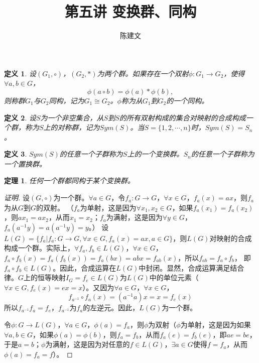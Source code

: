 \documentclass{article}
\newtheorem{Def}{定义}
\newtheorem{Thm}{定理}
\begin{document}
\begin{CJK*}{UTF8}{gbsn}
  \title{第五讲 变换群、同构}
  \author{陈建文}
  \maketitle
  
  \begin{Def}
    设$(G_1,\circ)$，$(G_2,*)$为两个群。如果存在一个双射$\phi:G_1\to G_2$，使得$\forall a,b\in G$，
    \[\phi(a\circ b)=\phi(a)* \phi(b),\]
    则称群$G_1$与$G_2$同构，记为$G_1\cong G_2$。$\phi$称为从$G_1$到$G_2$的一个同构。
  \end{Def}

  \begin{Def}
    设$S$为一个非空集合，从$S$到$S$的所有双射构成的集合对映射的合成构成一个群，称为$S$上的对称群，记为$Sym(S)$。当$S=\{1,2,\cdots,n\}$时，$Sym(S)=S_n$。
  \end{Def}

\begin{Def}
  $Sym(S)$的任意一个子群称为$S$上的一个变换群。$S_n$的任意一个子群称为一个置换群。
\end{Def}

\begin{Thm}
  任何一个群都同构于某个变换群。
\end{Thm}
\begin{proof}[证明]
  设$(G,\circ)$为一个群。$\forall a\in G$，令$f_a:G\to G$，$\forall x\in G$，$f_a(x)=ax$，则$f_a$为从$G$到$G$的双射。
  （$f_a$为单射，这是因为$\forall x_1,x_2\in G$，如果$f_a(x_1)=f_a(x_2)$，则$ax_1=ax_2$，从而$x_1=x_2$；$f_a$为满射，这是因为$\forall y\in G$，$f_a(a^{-1}y)=a(a^{-1}y)=y$。）
设$L(G)=\{f_a|f_a:G\to G,\forall x\in G,f_a(x)=ax,a\in G\}$，则$L(G)$对映射的合成构成一个群。实际上，$\forall f_a,f_b\in L(G)$，$\forall x\in G$，$f_a\circ f_b(x)=f_a(f_b(x))=f_a(bx)=abx=f_{ab}(x)$，所以$f_{ab}=f_a\circ f_b$，
即$f_a\circ f_b\in L(G)$。因此，合成运算在$L(G)$中封闭。显然，合成运算满足结合律。$G$上的恒等映射$I_G=f_e\in L(G)$为$L(G)$中的单位元素（$\forall x\in G,f_e(x)=ex=x$）。又因为$\forall a\in G$，$\forall x\in G$，
\[f_{a^{-1}}\circ f_a(x)=(a^{-1}a)x=x=f_e(x)\]
所以$f_{a^{-1}}f_a=f_e$，$f_{a^{-1}}$为$f_a$的左逆元。因此，$L(G)$为一个群。

令$\phi:G\to L(G)$，$\forall a\in G$，$\phi(a)=f_a$，则$\phi$为双射（$\phi$为单射，这是因为如果$\forall a,b\in G$，如果$\phi(a)=\phi(b)$，则$f_a=f_b$，从而$f_a(e)=f_b(e)$，即$ae=be$，于是$a=b$；$\phi$为满射，这是因为对任意的$f\in L(G)$，$\exists a\in G$使得$f=f_a$，从而$\phi(a)=f_a=f$）。


\end{proof}
\end{CJK*}
\end{document}

